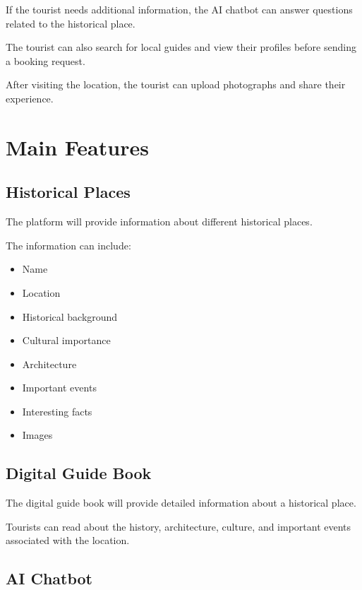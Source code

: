 \documentclass[12pt,a4paper]{article}
\begin{document}
If the tourist needs additional information, the AI chatbot can answer
questions related to the historical place.

The tourist can also search for local guides and view their profiles
before sending a booking request.

After visiting the location, the tourist can upload photographs and share
their experience.



\section{Main Features}

\subsection{Historical Places}

The platform will provide information about different historical places.

The information can include:

\begin{itemize}[leftmargin=*]

    \item Name
    \item Location
    \item Historical background
    \item Cultural importance
    \item Architecture
    \item Important events
    \item Interesting facts
    \item Images

\end{itemize}


\subsection{Digital Guide Book}

The digital guide book will provide detailed information about a
historical place.

Tourists can read about the history, architecture, culture, and important
events associated with the location.


\subsection{AI Chatbot}
\end{document}
